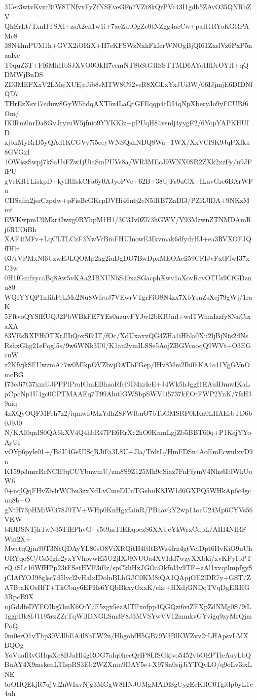 3Uer3wtvKvzrRiW8TNfvvFyZfNSEveGFn7VZt8kQrPVc43I1gdb5ZAvO35QNRbZV
QhErLt/TxnHTSXI+zsA2en1w1i+7acZutOgZc0tNZgg4acCw+paH1RYoKGRPAMc8
38N4ImPUM1h+GVX2iORiX+H7eKFSWzNxkFkIcrWNOgBjQI61ZxslVz6PxP5naaKc
T6quZ3T+Ff6MhHbSJXVO0OkH7ecmNT8bStGRSSTTMD6AYoHlDrOYH+qQDMWjBnDS
ZD3MEFXxV2LMsjXUEjrJib8sMTW8C92vsR8XGLxYxJUi3W/06IJjmjE6DIDNfQD7
THrEzXsv17eduw8GyW5hdqAXT5z4LaQtGFEqqp4tDI4qNpXberyJo9yFCURf6Om/
IKlRm0nrDa8GvJryruW5jfuio9YYKKlz+pPUqH84vsnlj4yygF2/6YopYAPKHUID
xjbkMyRrD5yQAd1KCGVy7i5eeyWNSQshNDQ8Wa+1WX/XxVClSK9JqPXfku8GVGxI
1OWiszSwpj7kSaUsFZw1jUiaSmPUVs8a/WR3MEcJ9WNX0SR2ZXk2xzFy/u9JFfPU
gVcKRTLiskpD+kyfRllskCFa6y0AJyoPVc+62B+38UjFs9uGX+fLuvGre6BArWFu
CHSafm2jsrCzpdw+pFisBcGKrpDVHi46ntj2eN5lRB7ZaDI3/PZRJlDA+9NKzMmt
EWKwpmU9Mkr4Iwxg0BYhpM1H1/3C3Jv0Zl73hGWV/V93MzwnZTNMDAmRj6RUOiBh
XAF4iMFv+LqCLTLCzF3NwVrBmFHUInowE3Ikvmak6dfydrHJ+ea3RVXOFJQfIHlr
03/rVPMxNl6UzwEJLQOMp2kg2iuDgDO7BwDpxMEOAeli59CFIJvFxtFfwI37xC3w
0H1fGmfzycaBq8Aw5vKAa2JBNUNbS40xaSGacphXwv1oXovRcvOTUs9CfGDznu80
WQIYYQP1nIihPrLMs2Nu8WfruJ7VEwrVTgrFiO8N4zx7XbYsnZsXcj79gWj/1raK
5FftvoQYSfEUQJ2PbWBkFE7YEs0nzuvFYJwl2bKIUml+wdTWmaIzzfy8NnCixaXA
83VEsRXPHOTXrJlIiQoxSEiIT/fOc/XdUxaxvQG4ZHa4iHbla0Xu2ljBjNts2dNs
RshxGhg21eFqgl5s/9w6WNk3U0/K1au2ymILSSe5AojZBGVcooqQ9WVt+O3EGcuW
z2KfvjkSFUwzmA77w0MlkpOVZbvjOATbFGep/IHv8Mm2Ih0hKA4o11YgGVnOmcBG
I73eJi7t37xmUJPPPlPraIGmEBhaaRfeI9D4xrIeE+J4Wk5hJggf1EAuIDmwIKaL
pCpcNp1U4gc0CPTMAAEq7T99AlutlGWSbpSWV1i5737kEOtFWP2YnK/7fsH39aiq
4zXQyOQFMFeh7z2/iqmwfJMzYdhZ8FWfbnO7bToGMSRP0kKa0LHAErbTD6b0J9J0
N/KAI0qnIS0QA6kXV4Q4hbR47PE6RrXc2hO0KnmLgjZb5BBT60q+P1KejYYoAyUf
vOYp6pyle01+/BdU4GsUISqRJiFa3L8U+Jla/TrdtL/HmFDSn4AoEmEcwulxvD9n
K159p3mrrRcNCH9qCUYbuwmU/zm8S9Z125Mh9qSiaz7FnFfymV4Nhs6ItlWkUoW6
0+nqlQqFHvZb4rWCbu3zxNdLvCmeDUnTGebuK8JW1d6GXPQ5WHkAp6c4gcuu8b+O
gNtH73pHMiW0i78J9TV+WHp0KnHgxfaiuR/PBaavkY2wp14ocU24Mp6CYVs56VKW
t4BDSNTjhTwN35TfEPhvG+s5t9mTIEEqoczS6XXUeYkWrxCdpL/AIH4NIRFWm2X+
MwctqQjm90T3NtQDAyYL80sO8ViXRQitH4ftltBWz4frn4gtVclDpt6HvKiO9uUh
URYqo8C/CsMgfr2yxYVhovwEi5U2jIXJ9NUOa4XVIdd7wzyXXbki/xvKPyIbPTrQ
iSLt16WfHPp23tFSetHVF3iEz/spCkliHxJGOaOkfnl3v9TF+zAl1xvqtlmpfgyS
jClAfYOJ98glsc7d5lvcl2vHalxIDolnBLhGJC0KM8iQA1QApjOE2lDR7y+GST/Z
A7BtaKOsHfT+TkCbny6EPHs6YQbBkxvOxxK/eke+HXdjGNDqTVqDgERHG3RpcB9X
njGddfeDYEOIbg7hnK6OiY7E5zgx5ezAlTFxofpp4QGQzi6viZEXpZdNMg0S/9iL
1ggpBk8IJ1195rzZZrTqWlIDNGLSm3F8J3MVSYwVV12mmkvGYvigq9zyMrQjmPoQ
9m0erO1vThp30VJlbEA4l8bFW2u/HhgobfH5GB79Y3BlKWZvv2rLHApsvLMXBQOg
YoVuafRvGHqsXc8BJaHi4gROG7aIq0hecQrIP8LfSGkjvo5452vbOEPTleAuyLbQ
BuAY4X9mskenLTIspRS3Eb2WZXmn9DAY5e+X97Sn0sijJiYTQyLO/q9oLv3ixLNE
brOHQEkjR7ujVl2nWIxvNjg3MGgW8HNJUMgMADlSgUygEeKRC0TgitlpbyLTe4uh
